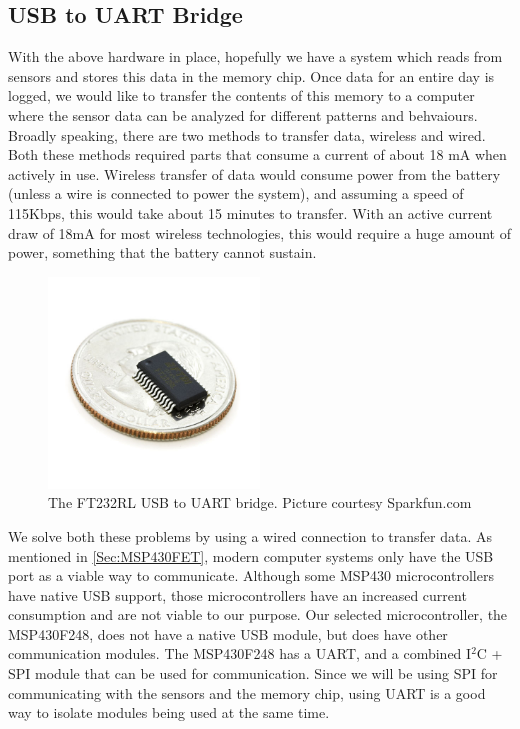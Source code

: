 \subsection{USB to UART Bridge}
\label{Sec:FT232}
With the above hardware in place, hopefully we have a system which reads from sensors and stores this data in the memory chip. Once data for an entire day is logged, we would like to transfer the contents of this memory to a computer where the sensor data can be analyzed for different patterns and behvaiours. Broadly speaking, there are two methods to transfer data, wireless and wired. Both these methods required parts that consume a current of about 18 mA when actively in use. Wireless transfer of data would consume power from the battery (unless a wire is connected to power the system), and assuming a speed of 115Kbps, this would take about 15 minutes to transfer. With an active current draw of 18mA for most wireless technologies, this would require a huge amount of power, something that the battery cannot sustain.
\begin{figure}
\begin{center}
\includegraphics[width=0.5\textwidth]{images/FT232coin.jpg}
\caption{The FT232RL USB to UART bridge. Picture courtesy Sparkfun.com}
\label{Fig:MSP430FET}
\end{center}
\end{figure}

We solve both these problems by using a wired connection to transfer data. As mentioned in \ref{Sec:MSP430FET}, modern computer systems only have the USB port as a viable way to communicate. Although some MSP430 microcontrollers have native USB support, those microcontrollers have an increased current consumption and are not viable to our purpose. Our selected microcontroller, the MSP430F248, does not have a native USB module, but does have other communication modules. The MSP430F248 has a UART, and a combined I$^2$C + SPI module that can be used for communication. Since we will be using SPI for communicating with the sensors and the memory chip, using UART is a good way to isolate modules being used at the same time. 

